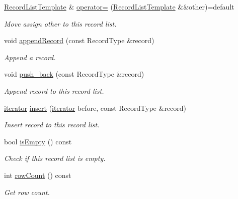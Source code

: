 \begin{DoxyCompactItemize}
\hyperlink{class_mdt_1_1_plain_text_1_1_record_list_template}{Record\+List\+Template} \& \hyperlink{class_mdt_1_1_plain_text_1_1_record_list_template_a323367ad799d8ec5398e56e6de9d933e}{operator=} (\hyperlink{class_mdt_1_1_plain_text_1_1_record_list_template}{Record\+List\+Template} \&\&other)=default
\begin{DoxyCompactList}\small\item\em Move assign {\itshape other} to this record list. \end{DoxyCompactList}\item 
void \hyperlink{class_mdt_1_1_plain_text_1_1_record_list_template_acf9720dd89942675131a6784277693de}{append\+Record} (const Record\+Type \&record)
\begin{DoxyCompactList}\small\item\em Append a record. \end{DoxyCompactList}\item 
void \hyperlink{class_mdt_1_1_plain_text_1_1_record_list_template_a0d87d865b6c32aa07f9f5d85a3139a8a}{push\+\_\+back} (const Record\+Type \&record)
\begin{DoxyCompactList}\small\item\em Append record to this record list. \end{DoxyCompactList}\item 
\hyperlink{class_mdt_1_1_plain_text_1_1_record_list_template_a5b0caae56b05a38e53539cad1da8cd12}{iterator} \hyperlink{class_mdt_1_1_plain_text_1_1_record_list_template_ad61ba099c68f630c7d6001fbfd6a277a}{insert} (\hyperlink{class_mdt_1_1_plain_text_1_1_record_list_template_a5b0caae56b05a38e53539cad1da8cd12}{iterator} before, const Record\+Type \&record)
\begin{DoxyCompactList}\small\item\em Insert record to this record list. \end{DoxyCompactList}\item 
bool \hyperlink{class_mdt_1_1_plain_text_1_1_record_list_template_abe112d23858a17cc597d3acebf4b1389}{is\+Empty} () const 
\begin{DoxyCompactList}\small\item\em Check if this record list is empty. \end{DoxyCompactList}\item 
int \hyperlink{class_mdt_1_1_plain_text_1_1_record_list_template_a04eb7dcdccf22e771d5012d4946cb013}{row\+Count} () const 
\begin{DoxyCompactList}\small\item\em Get row count. \end{DoxyCompactList}\item 

\end{DoxyCompactItemize}
